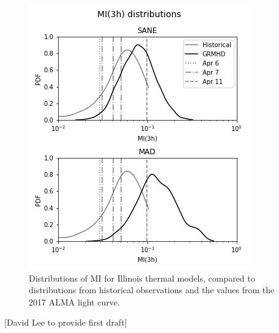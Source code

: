 \begin{figure}
  \centering
    \includegraphics[width=\columnwidth]{./figures/mi_dist.png}
  \caption{Distributions of MI for Illinois thermal models, compared to distributions from historical observations and the values from the 2017 ALMA light curve. }
  \label{fig:cmp_ALMA_var}
\end{figure}

[David Lee to provide first draft]


